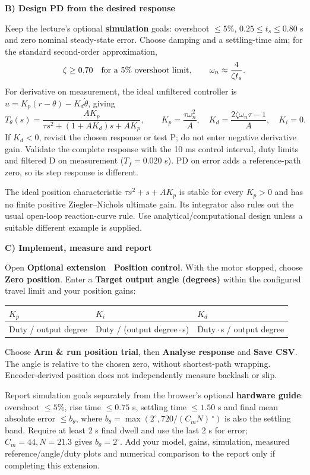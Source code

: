 \documentclass[11pt,a4paper]{article}
\newcommand{\sub}[1]{\vspace{3pt}\noindent\textbf{#1}\par}
\newcommand{\ui}[1]{\textbf{#1}}
\begin{document}
\sub{B) Design PD from the desired response}
Keep the lecture's optional \textbf{simulation} goals: overshoot $\leq5\%$, $0.25\leq t_s\leq0.80$ s and zero nominal steady-state error. Choose damping and a settling-time aim; for the standard second-order approximation,
\[
\zeta\geq0.70\quad\hbox{for a 5\% overshoot limit},\qquad
\omega_n\approx\frac{4}{\zeta t_s}.
\]
For derivative on measurement, the ideal unfiltered controller is $u=K_p(r-\theta)-K_d\dot\theta$, giving
\[
T_\theta(s)=\frac{A K_p}{\tau s^2+(1+A K_d)s+A K_p},\qquad
\boxed{K_p=\frac{\tau\omega_n^2}{A},\quad
K_d=\frac{2\zeta\omega_n\tau-1}{A},\quad K_i=0.}
\]
If $K_d<0$, revisit the chosen response or test P; do not enter negative derivative gain. Validate the complete response with the 10 ms control interval, duty limits and filtered D on measurement ($T_f=0.020$ s). PD on error adds a reference-path zero, so its step response is different.

The ideal position characteristic $\tau s^2+s+A K_p$ is stable for every $K_p>0$ and has no finite positive Ziegler--Nichols ultimate gain. Its integrator also rules out the usual open-loop reaction-curve rule. Use analytical/computational design unless a suitable different example is supplied.

\sub{C) Implement, measure and report}
Open \ui{Optional extension \textperiodcentered\ Position control}. With the motor stopped, choose \ui{Zero position}. Enter a \ui{Target output angle (degrees)} within the configured travel limit and your position gains:
\begin{center}\small
\begin{tabular}{@{}lll@{}}
\toprule
$K_p$ & $K_i$ & $K_d$\\
\midrule
Duty / output degree & Duty / (output degree\,$\cdot$\,s) & Duty\,$\cdot$\,s / output degree\\
\bottomrule
\end{tabular}
\end{center}
Choose \ui{Arm \& run position trial}, then \ui{Analyse response} and \ui{Save CSV}. The angle is relative to the chosen zero, without shortest-path wrapping. Encoder-derived position does not independently measure backlash or slip.

Report simulation goals separately from the browser's optional \textbf{hardware guide}: overshoot $\leq5\%$, rise time $\leq0.75$ s, settling time $\leq1.50$ s and final mean absolute error $\leq b_\theta$, where $b_\theta=\max(2^\circ,720/(C_mN)\,{}^\circ)$ is also the settling band. Require at least 2 s final dwell and use the last 2 s for error; $C_m=44,N=21.3$ gives $b_\theta=2^\circ$. Add your model, gains, simulation, measured reference/angle/duty plots and numerical comparison to the report only if completing this extension.
\end{document}
